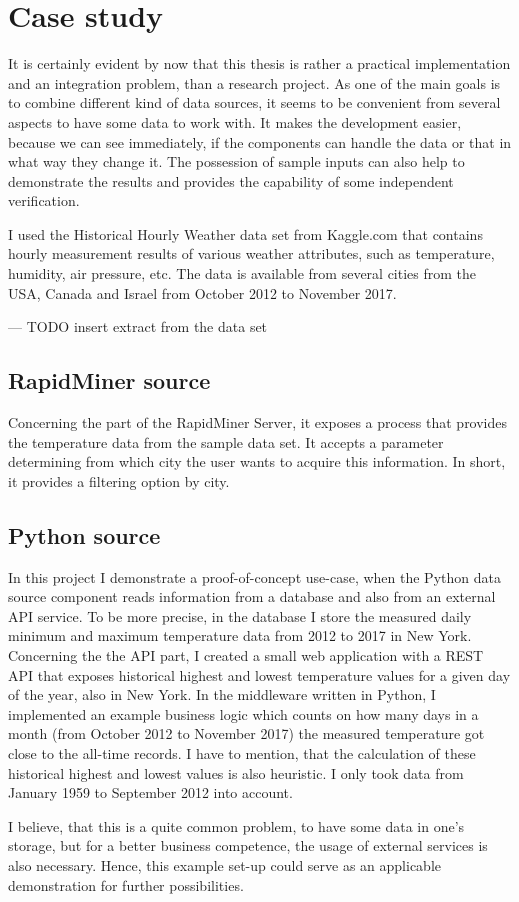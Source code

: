 \chapter{Case study} \label{case-study}

It is certainly evident by now that this thesis is rather a practical implementation and an integration problem, than a research project. As one of the main goals is to combine different kind of data sources, it seems to be convenient from several aspects to have some data to work with. It makes the development easier, because we can see immediately, if the components can handle the data or that in what way they change it. The possession of sample inputs can also help to demonstrate the results and provides the capability of some independent verification.

I used the Historical Hourly Weather data set from Kaggle.com that contains hourly measurement results of various weather attributes, such as temperature, humidity, air pressure, etc. The data is available from several cities from the USA, Canada and Israel from October 2012 to November 2017.

\begin{center}
	--- TODO insert extract from the data set
\end{center}

\section{RapidMiner source}

Concerning the part of the RapidMiner Server, it exposes a process that provides the temperature data from the sample data set. It accepts a parameter determining from which city the user wants to acquire this information. In short, it provides a filtering option by city.

\section{Python source} \label{case-study-python-source}

In this project I demonstrate a proof-of-concept use-case, when the Python data source component reads information from a database and also from an external API service. To be more precise, in the database I store the measured daily minimum and maximum temperature data from 2012 to 2017 in New York. Concerning the the API part, I created a small web application with a REST API that exposes historical highest and lowest temperature values for a given day of the year, also in New York. In the middleware written in Python, I implemented an example business logic which counts on how many days in a month (from October 2012 to November 2017) the measured temperature got close to the all-time records. I have to mention, that the calculation of these historical highest and lowest values is also heuristic. I only took data from January 1959 to September 2012 into account.

I believe, that this is a quite common problem, to have some data in one's storage, but for a better business competence, the usage of external services is also necessary. Hence, this example set-up could serve as an applicable demonstration for further possibilities.